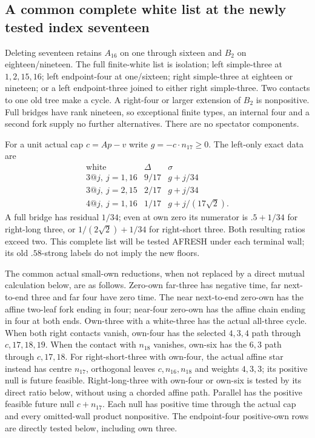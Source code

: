 \subsection{A common complete white list at the newly tested index seventeen}
\label{app:exact19:Bchangedlist}

Deleting seventeen retains \(A_{16}\)
on one through sixteen and \(B_2\)
on eighteen/nineteen.
The full finite-white list is
isolation; left simple-three at
\(1,2,15,16\); left endpoint-four
at one/sixteen; right simple-three
at eighteen or nineteen; or a
left endpoint-three joined to
either right simple-three.
Two contacts to one old tree
make a cycle.
A right-four or larger extension
of \(B_2\) is nonpositive.
Full bridges have rank nineteen,
so exceptional finite types,
an internal four and a second
fork supply no further alternatives.
There are no spectator components.

For a unit actual cap \(c=Ap-v\)
write \(g=-c\cdot n_{17}\ge0\).
The left-only exact data are
\[
\begin{array}{c|c|c}
 \text{white}&\Delta&\sigma\\ \hline
 3@j,\ j=1,16&9/17&g+j/34\\
 3@j,\ j=2,15&2/17&g+j/34\\
 4@j,\ j=1,16&1/17&g+j/(17\sqrt2).
\end{array}
\]
A full bridge has residual \(1/34\);
even at own zero its numerator
is \(.5+1/34\) for right-long
three, or \(1/(2\sqrt2)+1/34\)
for right-short three.
Both resulting ratios exceed two.
This complete list will be tested
AFRESH under each terminal wall;
its old \(.58\)-strong labels
do not imply the new floors.

The common actual small-own
reductions, when not replaced by
a direct mutual calculation below,
are as follows.
Zero-own far-three has negative
time, far next-to-end three and
far four have zero time.
The near next-to-end zero-own
has the affine two-leaf fork
ending in four; near-four
zero-own has the affine chain
ending in four at both ends.
Own-three with a white-three
has the actual all-three cycle.
When both right contacts vanish, own-four has the selected
\(4,3,4\) path through \(c,17,18,19\).
When the contact with \(n_{18}\) vanishes, own-six has the
\(6,3\) path through \(c,17,18\).
For right-short-three with own-four, the actual affine star instead
has centre \(n_{17}\), orthogonal leaves \(c,n_{16},n_{18}\)
and weights \(4,3,3\); its positive null is future feasible.
Right-long-three with own-four or own-six is tested by its direct
ratio below, without using a chorded affine path.
Parallel has the positive feasible future null \(c+n_{17}\).
Each null has positive time
through the actual cap and every
omitted-wall product nonpositive.
The endpoint-four positive-own
rows are directly tested below,
including own three.

